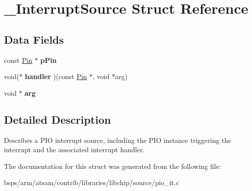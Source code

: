 \hypertarget{struct__InterruptSource}{}\section{\+\_\+\+Interrupt\+Source Struct Reference}
\label{struct__InterruptSource}
\subsection*{Data Fields}
\begin{DoxyCompactItemize}
\item 
\mbox{\label{struct__InterruptSource_a9e83c024f0eee92f99d15459779330ad}} 
const \mbox{\hyperlink{struct__Pin}{Pin}} $\ast$ {\bfseries p\+Pin}
\item 
\mbox{\label{struct__InterruptSource_a56877fa5b4298ca0b7dfab8c5cab3ada}} 
void($\ast$ {\bfseries handler} )(const \mbox{\hyperlink{struct__Pin}{Pin}} $\ast$, void $\ast$arg)
\item 
\mbox{\label{struct__InterruptSource_a6209bb1f44e318a62b0a224aa83e3b96}} 
void $\ast$ {\bfseries arg}
\end{DoxyCompactItemize}


\subsection{Detailed Description}
Describes a P\+IO interrupt source, including the P\+IO instance triggering the interrupt and the associated interrupt handler. 

The documentation for this struct was generated from the following file\+:\begin{DoxyCompactItemize}
\item 
bsps/arm/atsam/contrib/libraries/libchip/source/pio\+\_\+it.\+c\end{DoxyCompactItemize}
